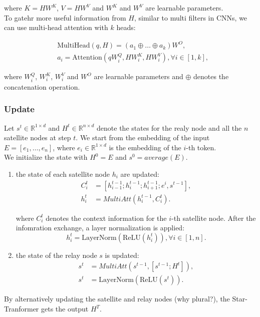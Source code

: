 where $K = HW^K$, $V = HW^V$ and $W^K$ and $W^V$ are learnable parameters.\\
To gatehr more useful information from $H$, similar to multi filters in CNNs, we
can use multi-head attention with $k$ heads:

\begin{align}
    & \text{MultiHead}(q, H) = (a_1 \oplus \dots \oplus a_k)W^O,\\
    & a_i = \text{Attention}(qW_i^Q, HW_i^K, HW_i^V), \forall i \in [1, k],
\end{align}

where $W_i^Q$, $W_i^K$, $W_i^V$ and $W^O$ are learnable parameters and $\oplus$
denotes the concatenation operation.

\subsubsection{Update}

Let $s^t \in \mathbb{R}^{1 \times d}$ and $H^t \in \mathbb{R}^{n \times d}$
denote the states for the realy node and all the $n$ satellite nodes at step
$t$.
We start from the embedding of the input $E = [e_1, \dots, e_n]$, where $e_i \in
\mathbb{R}^{1 \times d}$ is the embedding of the $i$-th token.\\
We initialize the state with $H^0 = E$ and $s^0 = average(E)$.\\
\begin{enumerate}
    \item the state of each satellite node $h_i$ are updated:
        \begin{align}
            C_i^t &= [h_{i-1}^{t-1}; h_i^{t-1}; h_{i+1}^{t-1}; e^i, s^{t-1}],\\
            h_i^t &= MultiAtt(h_i^{t-1}, C_i^t).
        \end{align}

        where $C_i^t$ denotes the context information for the $i$-th satellite
        node. After the infomration exchange, a layer normalization is applied:
        \begin{equation}
            h_i^t = \text{LayerNorm}(\text{ReLU}(h_i^t)), \forall i \in [1, n].
        \end{equation}

    \item the state of the relay node $s$ is updated:
        \begin{align}
            s^t &= MultiAtt(s^{t-1}, [s^{t-1}; H^t]), \\
            s^t &= \text{LayerNorm}(\text{ReLU}(s^t)).
        \end{align}
\end{enumerate}

By alternatively updating the satellite and relay nodes (why plural?), the
Star-Tranformer gets the output $H^T$.

        
